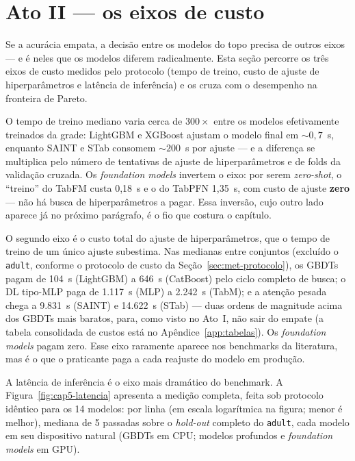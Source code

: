 \section{Ato II --- os eixos de custo}
\label{sec:cap5-ato2}

Se a acurácia empata, a decisão entre os modelos do topo precisa de
outros eixos --- e é neles que os modelos diferem radicalmente. Esta
seção percorre os três eixos de custo medidos pelo protocolo (tempo de
treino, custo de ajuste de hiperparâmetros e latência de inferência) e os
cruza com o desempenho na fronteira de Pareto.

O tempo de treino mediano varia cerca de $300\times$ entre os modelos
efetivamente treinados da grade:
LightGBM e XGBoost ajustam o modelo final em ${\sim}0{,}7$~s, enquanto
SAINT e STab consomem ${\sim}200$~s por ajuste --- e a diferença se
multiplica pelo número de tentativas de ajuste de hiperparâmetros e de
folds da validação cruzada. Os \emph{foundation models} invertem o
eixo: por serem \emph{zero-shot}, o ``treino'' do TabFM custa 0,18~s e o
do TabPFN 1,35~s, com custo de ajuste \textbf{zero} --- não há busca de
hiperparâmetros a pagar. Essa inversão, cujo outro lado aparece já no
próximo parágrafo, é o fio que costura o capítulo.

O segundo eixo é o custo total do ajuste de hiperparâmetros, que o tempo
de treino de um único ajuste subestima. Nas medianas entre conjuntos
(excluído o \texttt{adult}, conforme o protocolo de custo da
Seção~\ref{sec:met-protocolo}), os
GBDTs pagam de 104~s (LightGBM) a 646~s (CatBoost) pelo ciclo completo de
busca; o DL tipo-MLP paga de 1.117~s (MLP) a 2.242~s (TabM); e a atenção
pesada chega a 9.831~s (SAINT) e 14.622~s (STab) --- duas ordens de
magnitude acima dos GBDTs mais baratos, para, como visto no Ato~I, não
sair do empate (a tabela consolidada de custos está no
Apêndice~\ref{app:tabelas}). Os \emph{foundation models} pagam zero. Esse eixo raramente
aparece nos benchmarks da literatura, mas é o que o praticante paga a
cada reajuste do modelo em produção.

A latência de inferência é o eixo mais dramático do benchmark. A
Figura~\ref{fig:cap5-latencia} apresenta a medição completa, feita sob
protocolo idêntico para os 14 modelos: \us{} por linha (em escala
logarítmica na figura; menor é melhor), mediana de 5 passadas sobre o
\emph{hold-out} completo do \texttt{adult}, cada modelo em seu
dispositivo natural (GBDTs em CPU; modelos profundos e \emph{foundation models}
em GPU).

